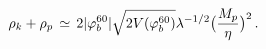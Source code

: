 \begin{equation} \label{res2}
\rho_{k} + \rho_{p} \, \simeq \, 2 |\varphi_b^{60}| \sqrt{2 V(\varphi_b^{60})} 
\lambda^{-1/2} \bigl( {{M_p} \over {\eta}} \bigr)^2 \, .
\end{equation}

